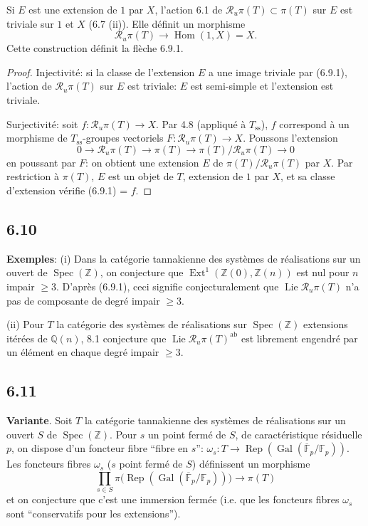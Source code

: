 \documentclass[12pt,a4paper]{article}
\theoremstyle{plain}
\theoremstyle{definition}
\theoremstyle{remark}
\DeclareMathOperator{\Hom}{Hom}
\DeclareMathOperator{\Spec}{Spec}
\DeclareMathOperator{\Gal}{Gal}
\DeclareMathOperator{\Ext}{Ext}
\DeclareMathOperator{\Lie}{Lie}
\DeclareMathOperator{\Rep}{Rep}
\newcommand{\ab}{\mathrm{ab}}
\newcommand{\Z}{\mathbb{Z}}
\newcommand{\Q}{\mathbb{Q}}
\newcommand{\F}{\mathbb{F}}
\begin{document}
Si $E$ est une extension de $1$ par $X$, l'action 6.1 de $\mathcal{R}_u\pi(T) 
\subset 
\pi(T)$ sur $E$ est triviale sur $1$ et $X$ (6.7 (ii)). Elle définit un morphisme
\[
\mathcal{R}_u\pi(T) 
\longrightarrow 
\Hom(1, X) = X.
\]
Cette construction définit la flèche 6.9.1.

\begin{proof}
Injectivité: si la classe de l'extension $E$ a une image triviale par (6.9.1), l'action de $\mathcal{R}_u\pi(T)$ sur $E$ est triviale: $E$ est semi-simple et l'extension est triviale.

Surjectivité: soit $f: 
\mathcal{R}_u\pi(T) 
\to X$. Par 4.8 (appliqué à $T_{\mathrm{ss}}$), $f$ correspond à un morphisme de $T_{\mathrm{ss}}$-groupes vectoriels $F: 
\mathcal{R}_u\pi(T) 
\to X$. Poussons l'extension
\[
0 
\longrightarrow 
\mathcal{R}_u\pi(T) 
\longrightarrow 
\pi(T) 
\longrightarrow 
\pi(T)/\mathcal{R}_u\pi(T) 
\longrightarrow 0
\]
en poussant par $F$: on obtient une extension $E$ de $\pi(T)/\mathcal{R}_u\pi(T)$ par $X$. Par restriction à $\pi(T)$, $E$ est un objet de $T$, extension de $1$ par $X$, et sa classe d'extension vérifie (6.9.1) = $f$.
\end{proof}

\subsection*{6.10}
\textbf{Exemples}: (i) Dans la catégorie tannakienne des systèmes de réalisations sur un ouvert de $\Spec(\Z)$, on conjecture que $\Ext^1(\Z(0), 
\Z(n))$ est nul pour $n$ impair $\geq 3$. D'après (6.9.1), ceci signifie conjecturalement que $\Lie\mathcal{R}_u\pi(T)$ n'a pas de composante de degré impair $\geq 3$.

(ii) Pour $T$ la catégorie des systèmes de réalisations sur $\Spec(\Z)$ extensions itérées de $\Q(n)$, 8.1 conjecture que $\Lie\mathcal{R}_u\pi(T)^{\ab}$ est librement engendré par un élément en chaque degré impair $\geq 3$.

\subsection*{6.11}
\textbf{Variante}. Soit $T$ la catégorie tannakienne des systèmes de réalisations sur un ouvert $S$ de $\Spec(\Z)$. Pour $s$ un point fermé de $S$, de caractéristique résiduelle $p$, on dispose d'un foncteur fibre ``fibre en $s$'': $\omega_s: T 
\to 
\Rep(\Gal(\overline{\F}_p/\F_p))$. Les foncteurs fibres $\omega_s$ ($s$ point fermé de $S$) définissent un morphisme
\[
\prod_{s 
\in S} 
\pi\bigl(\Rep(\Gal(\overline{\F}_p/\F_p))\bigr) 
\longrightarrow 
\pi(T)
\]
et on conjecture que c'est une immersion fermée (i.e. que les foncteurs fibres $\omega_s$ sont ``conservatifs pour les extensions'').
\end{document}
